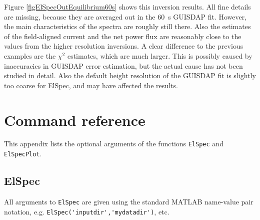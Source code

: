 \documentclass[12pt,a4paper]{report}
\begin{document}
Figure \ref{figElSpecOutEquilibrium60s} shows this inversion results. All fine details are missing, because they are averaged out in the 60~s GUISDAP fit. However, the main characteristics of the spectra are roughly still there. Also the estimates of the field-aligned current and the net power flux are reasonably close to the values from the higher resolution inversions. A clear difference to the previous examples are the $\chi^2$ estimates, which are much larger. This is possibly caused by inaccuracies in GUISDAP error estimation, but the actual cause has not been studied in detail. Also the default height resolution of the GUISDAP fit is slightly too coarse for ElSpec, and may have affected the results.





\appendix


\chapter{Command reference}\label{chapCommands}

This appendix lists the optional arguments of the functions \verb|ElSpec| and \verb|ElSpecPlot|. 

\section{ElSpec}

All arguments to \verb|ElSpec| are given using the standard MATLAB name-value pair notation, e.g. \verb|ElSpec('inputdir','mydatadir')|, etc. 
\end{document}
